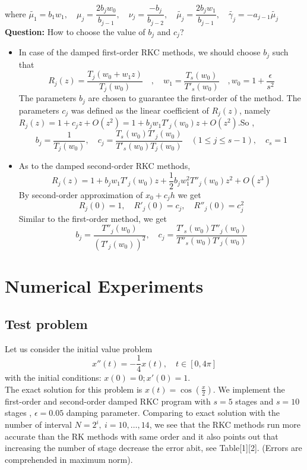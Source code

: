 \documentclass{article}
\theoremstyle{theorem}
\theoremstyle{definition}
\begin{document}
where $\tilde{\mu_{1}} =b_1w_1, \quad \mu_j=\dfrac{2b_jw_0}{b_{j-1}}, \quad \nu_j=\dfrac{-b_j}{b_{j-2}},\quad \tilde{\mu_j}=\dfrac{2b_jw_1}{b_{j-1}}, \quad \tilde{\gamma _j}=-a_{j-1} \tilde{\mu_j}$ \\
\textbf{Question:} How to choose the value of $b_j$ and $c_j$?\begin{itemize}
	\item In case of the damped first-order RKC methods, we should choose $b_j$ such that  $$R_j(z)=\frac{T_j(w_0+w_1z)}{T_j(w_0)} \quad , \quad w_1=\frac{T_s(w_0)}{T'_s(w_0)} \quad , w_0=1+\frac{\epsilon}{s^2}$$
	The parameters $b_j$ are chosen to guarantee the first-order of the method. The parameters $c_j$ was defined as the linear coefficient of $R_j(z)$, namely $R_j(z)=1+c_jz+O(z^2)=1+b_jw_1T'_j(w_0)z+O(z^2)$.So ,
	$$b_j=\frac{1}{T_j(w_0)} , \quad c_j=\frac{T_s(w_0)T'_j(w_0)}{T'_s(w_0)T_j(w_0)} \quad (1 \le j \le s-1) , \quad c_s=1$$
	\item As to the damped second-order RKC methods,
	$$R_j(z)=1+b_jw_1T'_j(w_0)z+\frac{1}{2}b_jw_1^2T''_j(w_0)z^2 +O(z^3)$$
	By second-order approximation of $x_0+c_jh$ we get $$R_j(0)=1, \quad R'_j(0)=c_j, \quad R''_j(0)=c_j^2$$ 
	Similar to the first-order method, we get
	$$b_j=\frac{T''_j(w_0)}{(T'_j(w_0))^2} , \quad c_j=\frac{T'_s(w_0)T''_j(w_0)}{T''_s(w_0)T'_j(w_0)}$$
\end{itemize}
	\section{Numerical Experiments}
	\subsection{Test problem}
	Let us consider the initial value problem
	$$x''(t)=-\frac{1}{4}x(t), \quad t \in \left[0,4 \pi\right]$$
	with the initial conditions: $x(0)=0; x'(0)=1$.\\
	The exact solution for this problem is $x(t)=\cos(\frac{x}{2})$. We implement the first-order and second-order damped RKC program with $s=5$ stages and $s=10$ stages , $\epsilon = 0.05$ damping parameter. Comparing to exact solution with the number of interval $N=2^i, \ i=10, \dots , 14$, we see that the RKC methods run more accurate than the RK methods with same order and it also points out that increasing the number of stage decrease the error abit, see Table[1][2]. (Errors are comprehended in maximum norm).
\end{document}
